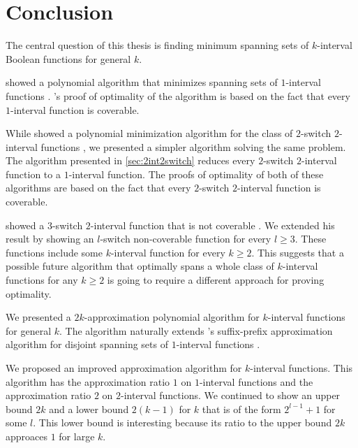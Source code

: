 \chapter*{Conclusion}


The central question of this thesis
is finding minimum spanning sets
of $k$-interval Boolean functions
for general $k$.

\citeauthor{Schieber2005154} showed a polynomial algorithm
that minimizes spanning sets of $1$-interval functions
\citep[Section 3]{Schieber2005154}.
\citeauthor{Schieber2005154}'s proof of optimality
of the algorithm
is based on the fact that every $1$-interval function
is coverable.

While \citeauthor{Dubovsky2012} showed
a polynomial minimization algorithm
for the class of $2$-switch $2$-interval functions
\citep[Section 4]{Dubovsky2012},
we presented a simpler algorithm
solving the same problem.
The algorithm presented in \cref{sec:2int2switch}
reduces every $2$-switch $2$-interval function
to a $1$-interval function.
The proofs of optimality of both of these algorithms
are based on the fact that every $2$-switch $2$-interval
function is coverable.

\citeauthor{Dubovsky2012} showed
a $3$-switch $2$-interval function
that is not coverable
\citep[p.~32]{Dubovsky2012}.
We extended his result by showing
an $l$-switch non-coverable function for every $l \geq 3$.
These functions include some $k$-interval function
for every $k \geq 2$.
This suggests that a possible future algorithm
that optimally spans a whole class
of $k$-interval functions
for any $k \geq 2$
is going to require a different approach
for proving optimality.

We presented a $2k$-approximation polynomial algorithm
for $k$-interval functions for general $k$.
The algorithm naturally extends
\citeauthor{Schieber2005154}'s suffix-prefix
approximation algorithm
for disjoint spanning sets of $1$-interval functions
\citep[section 6]{Schieber2005154}.

We proposed an improved approximation algorithm
for $k$-interval functions.
This algorithm has the approximation ratio $1$
on $1$-interval functions
and the approximation ratio $2$
on $2$-interval functions.
We continued to show an upper bound $2k$
and a lower bound $2(k-1)$
for $k$ that is of the form $2^{l-1}+1$ for some $l$.
This lower bound is interesting
because its ratio to the upper bound $2k$ approaces $1$
for large $k$.

